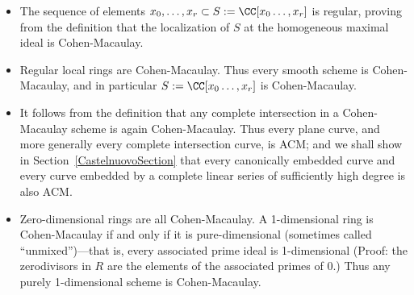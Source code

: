\begin{example}
\begin{itemize}
 \item The sequence of elements $x_{0},\dots, x_{r}\subset S:= \CC[x_{0}\dots, x_{r}]$ is regular, proving
 from the definition that the localization of $S$ at the homogeneous maximal ideal is Cohen-Macaulay.
 
 \item Regular local rings are Cohen-Macaulay. Thus every smooth scheme is Cohen-Macaulay, and in particular
$S:= \CC[x_{0}\dots, x_{r}]$ is Cohen-Macaulay. 
 
 \item It follows from the definition that any complete intersection in a Cohen-Macaulay scheme is again Cohen-Macaulay.
Thus every plane curve, and more generally every complete intersection curve,
is ACM; and we shall show in Section~\ref{CastelnuovoSection} that every canonically embedded curve
and every curve embedded by a complete linear series of sufficiently high degree is also ACM.

\item Zero-dimensional rings are all Cohen-Macaulay. A 1-dimensional ring is Cohen-Macaulay if and only if
it is pure-dimensional (sometimes called ``unmixed'')---that is, 
every associated prime ideal is 1-dimensional (Proof: the zerodivisors in $R$ are the elements of the associated primes of 0.) Thus any purely 1-dimensional scheme is Cohen-Macaulay. 

\end{itemize}

\end{example}

